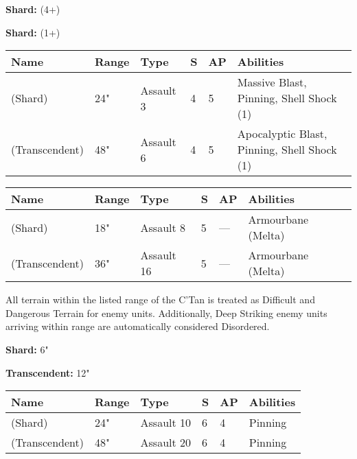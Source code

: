 \textbf{Shard:}  (4+)

\textbf{Shard:}  (1+)

 \label{Moulder of Worlds}

\noindent
\begin{tabular}{||m{160pt} m{31pt} m{55pt} m{12pt} m{12pt} m{200pt}||}
	\hline
	Name & Range & Type & S & AP & Abilities \\
	\hline
	\quickref{Moulder of Worlds} (Shard) & 24" & Assault 3 & 4 & 5 & Massive Blast, Pinning, Shell Shock (1) \\
	\quickref{Moulder of Worlds} (Transcendent) & 48" & Assault 6 & 4 & 5 & Apocalyptic Blast, Pinning, Shell Shock (1) \\
	\hline
\end{tabular}

 \label{Pyreshards}

\noindent
\begin{tabular}{||m{160pt} m{31pt} m{55pt} m{12pt} m{12pt} m{200pt}||}
	\hline
	Name & Range & Type & S & AP & Abilities \\
	\hline
	\quickref{Pyreshards} (Shard) & 18" & Assault 8 & 5 & — & Armourbane (Melta) \\
	\quickref{Pyreshards} (Transcendent) & 36" & Assault 16 & 5 & — & Armourbane (Melta) \\
	\hline
\end{tabular}

 \label{Sentient Singularity}

All terrain within the listed range of the C'Tan is treated as Difficult and Dangerous Terrain for enemy units. Additionally, Deep Striking enemy units arriving within range are automatically considered Disordered.

\textbf{Shard:} 6"

\textbf{Transcendent:} 12"

 \label{Seismic Assault}

\noindent
\begin{tabular}{||m{160pt} m{31pt} m{55pt} m{12pt} m{12pt} m{200pt}||}
	\hline
	Name & Range & Type & S & AP & Abilities \\
	\hline
	\quickref{Seismic Assault} (Shard) & 24" & Assault 10 & 6 & 4 & Pinning \\
	\quickref{Seismic Assault} (Transcendent) & 48" & Assault 20 & 6 & 4 & Pinning \\
	\hline
\end{tabular}

